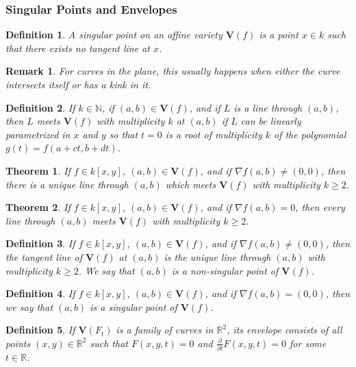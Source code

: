 \documentclass{article}
\theoremstyle{mystyle}
\newtheorem{theorem}{Theorem}[section]
\newtheorem{definition}{Definition}[section]
\newtheorem{remark}{Remark}[section]
\begin{document}
\subsubsection{Singular Points and Envelopes}
\begin{definition}
A singular point on an affine variety $\mathbf{V}(f)$ is a point $x\in k$ such that there exists no tangent line at $x$.
\end{definition}
\begin{remark}
For curves in the plane, this usually happens when either the curve intersects itself or has a kink in it.
\end{remark}
\begin{definition}
If $k\in \mathbb{N}$, if $(a,b)\in \mathbf{V}(f)$, and if $L$ is a line through $(a,b)$, then $L$ meets $\mathbf{V}(f)$ with multiplicity $k$ at $(a,b)$ if $L$ can be linearly parametrized in $x$ and $y$ so that $t=0$ is a root of multiplicity $k$ of the polynomial $g(t) = f(a+ct,b+dt)$.
\end{definition}
\begin{theorem}
If $f\in k[x,y]$, $(a,b) \in \mathbf{V}(f)$, and if $\nabla f(a,b) \ne (0,0)$, then there is a unique line through $(a,b)$ which meets $\mathbf{V}(f)$ with multiplicity $k\geq 2$.
\end{theorem}
\begin{theorem}
If $f\in k[x,y]$, $(a,b) \in \mathbf{V}(f)$, and if $\nabla f(a,b) = 0$, then every line through $(a,b)$ meets $\mathbf{V}(f)$ with multiplicity $k \geq 2$.
\end{theorem}
\begin{definition}
If $f\in k[x,y]$, $(a,b) \in \mathbf{V}(f)$, and if $\nabla f(a,b) \ne (0,0)$, then the tangent line of $\mathbf{V}(f)$ at $(a,b)$ is the unique line through $(a,b)$ with multiplicity $k\geq 2$. We say that $(a,b)$ is a non-singular point of $\mathbf{V}(f)$.
\end{definition}
\begin{definition}
If $f\in k[x,y]$, $(a,b) \in \mathbf{V}(f)$, and if $\nabla f(a,b) = (0,0)$, then we say that $(a,b)$ is a singular point of $\mathbf{V}(f)$.
\end{definition}
\begin{definition}
If $\mathbf{V}(F_t)$ is a family of curves in $\mathbb{R}^2$, its envelope consists of all points $(x,y) \in \mathbb{R}^2$ such that $F(x,y,t) = 0$ and $\frac{\partial}{\partial t}F(x,y,t) = 0$ for some $t\in \mathbb{R}$.
\end{definition}
\end{document}
